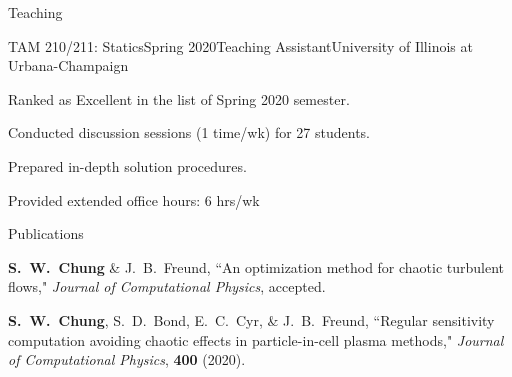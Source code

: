 \documentclass{resume} %
\begin{document}
\begin{rSection}{Teaching}


\begin{rSubsection}{TAM 210/211: Statics}{Spring 2020}{Teaching Assistant}{University of Illinois at Urbana-Champaign}
\item Ranked as Excellent in the list of Spring 2020 semester.
\item Conducted discussion sessions (1 time/wk) for 27 students.
\item Prepared in-depth solution procedures.
\item Provided extended office hours: 6 hrs/wk
\end{rSubsection}


\end{rSection}

\begin{rSection}{Publications}
\par
\textbf{S.\ W.\ Chung} \& J.\ B.\ Freund,
``An optimization method for chaotic turbulent flows,"
\textit{Journal of Computational Physics}, accepted.
\par
\textbf{S.\ W.\ Chung}, S.\ D.\ Bond, E.\ C.\ Cyr, \& J.\ B.\ Freund,
``Regular sensitivity computation avoiding chaotic effects in particle-in-cell plasma methods,"
\textit{Journal of Computational Physics}, \textbf{400} (2020).
\end{rSection}
\end{document}
